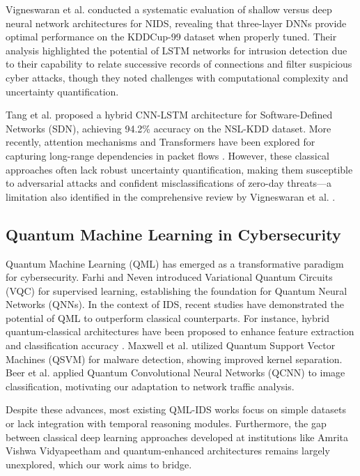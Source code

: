 \documentclass[conference]{IEEEtran}
\begin{document}
Vigneswaran et al. \cite{vigneswaran2018evaluating} conducted a systematic evaluation of shallow versus deep neural network architectures for NIDS, revealing that three-layer DNNs provide optimal performance on the KDDCup-99 dataset when properly tuned. Their analysis highlighted the potential of LSTM networks for intrusion detection due to their capability to relate successive records of connections and filter suspicious cyber attacks, though they noted challenges with computational complexity and uncertainty quantification.

Tang et al. \cite{ref5} proposed a hybrid CNN-LSTM architecture for Software-Defined Networks (SDN), achieving 94.2\% accuracy on the NSL-KDD dataset. More recently, attention mechanisms and Transformers have been explored for capturing long-range dependencies in packet flows \cite{ref13}. However, these classical approaches often lack robust uncertainty quantification, making them susceptible to adversarial attacks and confident misclassifications of zero-day threats—a limitation also identified in the comprehensive review by Vigneswaran et al. \cite{vigneswaran2020compendium}.

\subsection{Quantum Machine Learning in Cybersecurity}
Quantum Machine Learning (QML) has emerged as a transformative paradigm for cybersecurity. Farhi and Neven \cite{ref6} introduced Variational Quantum Circuits (VQC) for supervised learning, establishing the foundation for Quantum Neural Networks (QNNs). In the context of IDS, recent studies have demonstrated the potential of QML to outperform classical counterparts. For instance, hybrid quantum-classical architectures have been proposed to enhance feature extraction and classification accuracy \cite{ref14, ref15}. Maxwell et al. \cite{ref16} utilized Quantum Support Vector Machines (QSVM) for malware detection, showing improved kernel separation. Beer et al. \cite{ref8} applied Quantum Convolutional Neural Networks (QCNN) to image classification, motivating our adaptation to network traffic analysis. 

Despite these advances, most existing QML-IDS works focus on simple datasets or lack integration with temporal reasoning modules. Furthermore, the gap between classical deep learning approaches developed at institutions like Amrita Vishwa Vidyapeetham \cite{vinayakumar2017rnn, vinayakumar2017applying, vigneswaran2018evaluating} and quantum-enhanced architectures remains largely unexplored, which our work aims to bridge.
\end{document}
